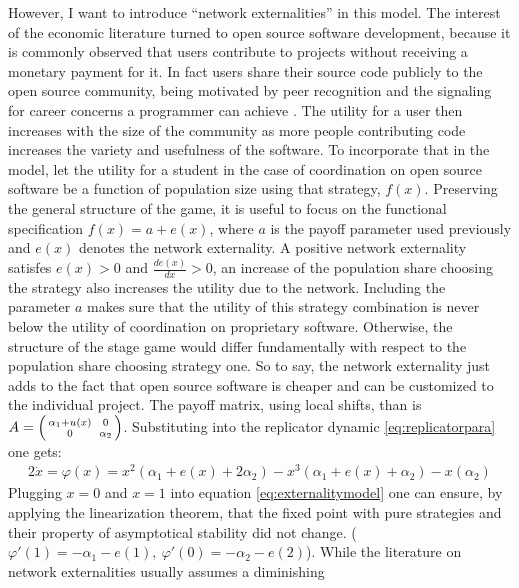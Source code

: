 However, I want to introduce ``network externalities'' in this model. 
The interest of the economic literature turned to open source software 
development, because it is commonly observed that users contribute to 
projects without receiving a monetary payment for it.
In fact users share their source code publicly to the open source community,
being motivated by peer recognition and the signaling for career concerns
a programmer can achieve \parencite[21]{lerner_simple_2002}.
The utility for a user then increases with the size of the community as 
more people contributing code increases the variety and usefulness of the 
software. 
To incorporate that in the model, let the utility for a student 
in the case of coordination on open source software be a function of 
population size using that strategy, $f(x)$. 
Preserving the general structure of the
game, it is useful to focus on the functional specification 
$f(x) = a + e(x)$, where $a$ is the payoff parameter used 
previously and $e(x)$ denotes the network externality. 
A positive network externality satisfes $e(x)>0$ and 
$\frac{de(x)}{dx}>0$, 
an increase of the population share choosing the strategy
also increases the utility due to the network. 
Including the parameter $a$ makes sure that the utility of this 
strategy combination is never below the utility of coordination on 
proprietary software. Otherwise, the structure of the stage game would 
differ fundamentally with respect to the population share choosing strategy 
one. So to say, the network externality just adds to the fact that open 
source software is cheaper and can be customized to the individual project.
The payoff matrix, using local shifts, than is 
$A=\begin{psmallmatrix}\alpha_1+u(x) && 0 \\ 0&& \alpha_2\end{psmallmatrix}$. 
Substituting into the replicator dynamic  \ref{eq:replicatorpara} one gets:
\begin{alignat}{2}
        \dot{x} = \varphi(x) = x^2(\alpha_1+e(x) +2\alpha_2 ) 
        - x^3(\alpha_1+e(x)+\alpha_2) - x(\alpha_2)
        \label{eq:externalitymodel}
\end{alignat}
Plugging $x=0$ and $x=1$ into equation \eqref{eq:externalitymodel} one can 
ensure, by applying the linearization theorem,
that the fixed point with pure strategies and their
property of asymptotical stability did not change.
($\varphi'(1) = -\alpha_1 -e(1),\ \varphi'(0) = -\alpha_2 -e(2)$).
While the literature on network externalities usually assumes a diminishing
